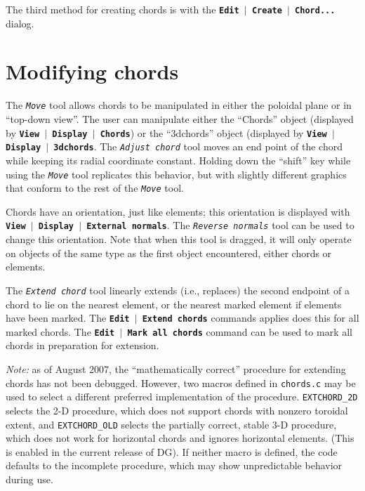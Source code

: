 \documentclass[12pt]{report}
\begin{document}
The third method for creating chords is with the 
\textbf{\texttt{Edit $\mid$ Create $\mid$ Chord...}} dialog.

\section{Modifying chords}

The \textit{\texttt{Move}} tool allows chords to be manipulated in either
the poloidal plane or in ``top-down view''.  The user can
manipulate either the ``Chords'' object (displayed by
\textbf{\texttt{View $\mid$ Display $\mid$ Chords}}) or the
``3dchords'' object 
(displayed by \textbf{\texttt{View $\mid$ Display $\mid$ 3dchords}}.
The \textit{\texttt{Adjust chord}} tool moves an end point of the chord
while keeping its radial coordinate constant.  Holding down the
``shift'' key while using the \textit{\texttt{Move}} 
tool replicates this behavior,
but with slightly
different graphics that conform to the rest of the \textit{\texttt{Move}} 
tool.

Chords have an orientation, just like elements; this
orientation is displayed with 
\textbf{\texttt{View $\mid$ Display $\mid$ External normals}}.
The \textit{\texttt{Reverse normals}} tool can be used to change this 
orientation. Note that when this tool is dragged, it will only
operate on objects of the same type as the
first object encountered, either chords or elements. 

The \textit{\texttt{Extend chord}} tool linearly
extends (i.e., replaces) the second endpoint  of a chord to lie on
the nearest element, or the nearest marked element if elements have
been marked.  The
\textbf{\texttt{Edit $\mid$ Extend chords}} commands applies does
this for all marked chords.  The 
\textbf{\texttt{Edit $\mid$ Mark all chords}} command can be used
to mark all chords in preparation for extension.


{\em Note:} as of August 2007, the ``mathematically correct'' procedure
for extending chords has not been debugged. However, two macros
defined in \texttt{chords.c} may be used to select a different preferred
implementation of the procedure.  \texttt{EXTCHORD\_2D} 
selects the 2-D
procedure, which does not support chords with nonzero
toroidal extent,
and \texttt{EXTCHORD\_OLD} selects the partially correct, stable
3-D procedure, which does not work for horizontal chords and ignores
horizontal elements. (This is enabled in the current
release of DG).
If neither macro is defined, the code defaults to
the incomplete procedure, which may show unpredictable behavior during
use.
\end{document}
